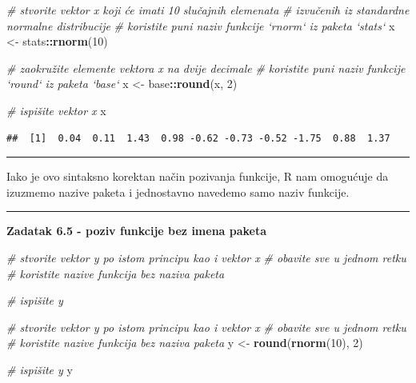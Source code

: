 \documentclass[]{book}
\newenvironment{Shaded}{\begin{snugshade}}{\end{snugshade}}
\newcommand{\KeywordTok}[1]{\textcolor[rgb]{0.13,0.29,0.53}{\textbf{#1}}}
\newcommand{\DecValTok}[1]{\textcolor[rgb]{0.00,0.00,0.81}{#1}}
\newcommand{\StringTok}[1]{\textcolor[rgb]{0.31,0.60,0.02}{#1}}
\newcommand{\CommentTok}[1]{\textcolor[rgb]{0.56,0.35,0.01}{\textit{#1}}}
\newcommand{\OperatorTok}[1]{\textcolor[rgb]{0.81,0.36,0.00}{\textbf{#1}}}
\newcommand{\NormalTok}[1]{#1}
\theoremstyle{definition}
\theoremstyle{definition}
\theoremstyle{definition}
\theoremstyle{remark}
\begin{document}
\begin{Shaded}
\begin{Highlighting}[]
\CommentTok{# stvorite vektor x koji će imati 10 slučajnih elemenata}
\CommentTok{# izvučenih iz standardne normalne distribucije}
\CommentTok{# koristite puni naziv funkcije `rnorm` iz paketa `stats`}
\NormalTok{x <-}\StringTok{ }\NormalTok{stats}\OperatorTok{::}\KeywordTok{rnorm}\NormalTok{(}\DecValTok{10}\NormalTok{)}

\CommentTok{# zaokružite elemente vektora x na dvije decimale}
\CommentTok{# koristite puni naziv funkcije `round` iz paketa `base`}
\NormalTok{x <-}\StringTok{ }\NormalTok{base}\OperatorTok{::}\KeywordTok{round}\NormalTok{(x, }\DecValTok{2}\NormalTok{)}

\CommentTok{# ispišite vektor x}
\NormalTok{x }
\end{Highlighting}
\end{Shaded}

\begin{verbatim}
##  [1]  0.04  0.11  1.43  0.98 -0.62 -0.73 -0.52 -1.75  0.88  1.37
\end{verbatim}

\begin{center}\rule{0.5\linewidth}{\linethickness}\end{center}

Iako je ovo sintaksno korektan način pozivanja funkcije, R nam omogućuje
da izuzmemo nazive paketa i jednostavno navedemo samo naziv funkcije.

\begin{center}\rule{0.5\linewidth}{\linethickness}\end{center}

\textbf{Zadatak 6.5 - poziv funkcije bez imena paketa}

\begin{Shaded}
\begin{Highlighting}[]
\CommentTok{# stvorite vektor y po istom principu kao i vektor x}
\CommentTok{# obavite sve u jednom retku}
\CommentTok{# koristite nazive funkcija bez naziva paketa}

\CommentTok{# ispišite y}
\end{Highlighting}
\end{Shaded}

\begin{Shaded}
\begin{Highlighting}[]
\CommentTok{# stvorite vektor y po istom principu kao i vektor x}
\CommentTok{# obavite sve u jednom retku}
\CommentTok{# koristite nazive funkcija bez naziva paketa}
\NormalTok{y <-}\StringTok{ }\KeywordTok{round}\NormalTok{(}\KeywordTok{rnorm}\NormalTok{(}\DecValTok{10}\NormalTok{), }\DecValTok{2}\NormalTok{)}

\CommentTok{# ispišite y}
\NormalTok{y}
\end{Highlighting}
\end{Shaded}
\end{document}
